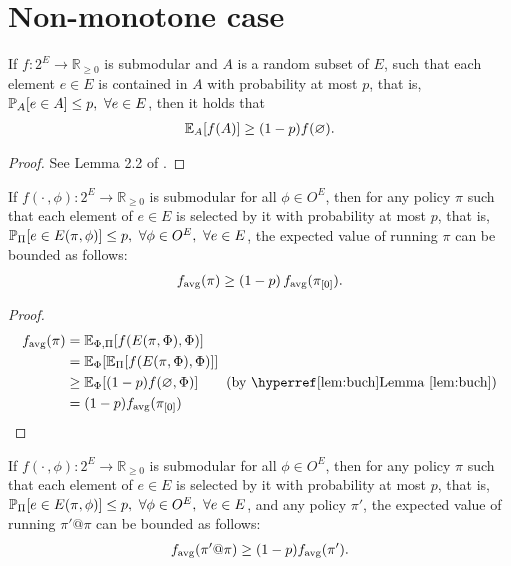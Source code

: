 \section{Non-monotone case}
\begin{lemma}\label{lem:buch}
  If $f : 2^E \to \mathbb{R}_{\geq 0}$ is submodular and $A$ is a random subset of $E$, such that each element $e \in E$ is contained in $A$ with probability at most $p$, that is, $\P[A]{e \in A} \leq p,\ \forall e \in E$, then it holds that
  \begin{align*}
    \E[A]{f(A)} \geq (1-p)f(\varnothing).
  \end{align*}
\end{lemma}
\begin{proof}
  See Lemma 2.2 of \citet{buchbinder14}.
\end{proof}

\begin{lemma}\label{lem:nmon}
  If $f(\cdot\,, \phi) : 2^E \to \mathbb{R}_{\geq 0}$ is submodular for all $\phi \in O^E$, then for any policy $\pi$ such that each element of $e \in E$ is selected by it with probability at most $p$, that is, $\P[\Pi]{e \in E(\pi, \phi)} \leq p,\ \forall \phi \in O^E,\ \forall e \in E$, the expected value of running $\pi$ can be bounded as follows:
\begin{align*}
  f_{\mathrm{avg}}(\pi) \geq (1-p)\,f_{\mathrm{avg}}(\pi_{[0]}).
\end{align*}
\end{lemma}
\begin{proof}
  \begin{align*}
    \favg(\pi) &= \E[\Phi,\Pi]{f(E(\pi, \Phi), \Phi)}\\
               &= \E[\Phi]{\E[\Pi]{f(E(\pi, \Phi), \Phi)}}\\
               &\geq \E[\Phi]{(1-p)f(\varnothing, \Phi)} \tag*{(by \lemmaref{lem:buch})}\\
               &= (1-p)\favg(\pio)
  \end{align*}
\end{proof}

\begin{cor}\label{cor:nmon}
  If $f(\cdot\,, \phi) : 2^E \to \mathbb{R}_{\geq 0}$ is submodular for all $\phi \in O^E$, then for any policy $\pi$ such that each element of $e \in E$ is selected by it with probability at most $p$, that is, $\P[\Pi]{e \in E(\pi, \phi)} \leq p,\ \forall \phi \in O^E,\ \forall e \in E$, and any policy $\pi'$, the expected value of running $\pi'@\pi$ can be bounded as follows:
\begin{align*}
  f_{\mathrm{avg}}(\pi' @ \pi) \geq (1-p)f_{\mathrm{avg}}(\pi').
\end{align*}
\end{cor}


